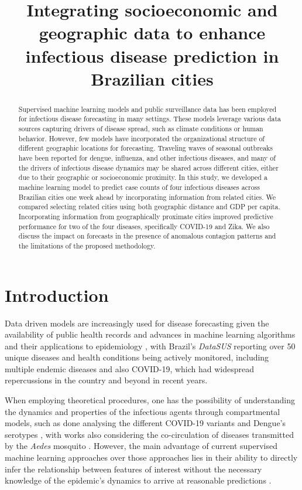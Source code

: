
\title{Integrating socioeconomic and geographic data to enhance infectious disease prediction in Brazilian cities}
\begin{abstract}       

    Supervised machine learning models and public surveillance data has been employed for infectious disease forecasting in many settings. These models leverage various data sources capturing drivers of disease spread, such as climate conditions or human behavior. However, few models have incorporated the organizational structure of different geographic locations for forecasting. Traveling waves of seasonal outbreaks have been reported for dengue, influenza, and other infectious diseases, and many of the drivers of infectious disease dynamics may be shared across different cities, either due to their geographic or socioeconomic proximity. In this study, we developed a machine learning model to predict case counts of four infectious diseases across Brazilian cities one week ahead by incorporating information from related cities. We compared selecting related cities using both geographic distance and GDP per capita. Incorporating information from geographically proximate cities improved predictive performance for two of the four diseases, specifically COVID-19 and Zika. We also discuss the impact on forecasts in the presence of anomalous contagion patterns and the limitations of the proposed methodology.

\end{abstract}
\maketitle


\section{Introduction}



Data driven models are increasingly used for disease forecasting given the availability of public health records and advances in machine learning algorithms and their applications to epidemiology \cite{Zhao2020Sep, Rahimi2023Nov}, with Brazil's \textit{DataSUS} \cite{Datasus_site} reporting over 50 unique diseases and health conditions being actively monitored, including multiple endemic diseases and also COVID-19, which had widespread repercussions in the country and beyond in recent years. 

When employing theoretical procedures, one has the possibility of understanding the dynamics and properties of the infectious agents through compartmental models, such as done analysing the different COVID-19 variants \cite{Dutta2022Jun} and Dengue's serotypes \cite{Andraud2012Nov}, with works also considering the co-circulation of diseases transmitted by the \textit{Aedes} mosquito \cite{Hirata2023Aug}. However, the main advantage of current supervised machine learning approaches over those approaches lies in their ability to directly infer the relationship between features of interest without the necessary knowledge of the epidemic's dynamics to arrive at reasonable predictions \cite{Roster2022Sep}. 

